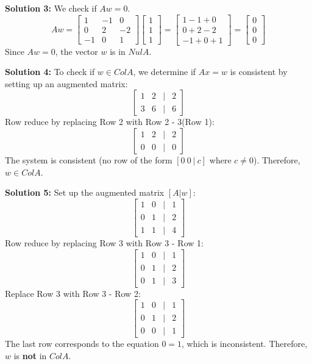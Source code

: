 \documentclass[11pt]{article}
\begin{document}
\vspace{0.3cm}
\textbf{Solution 3:} We check if $Aw = 0$.
$$ Aw = \begin{bmatrix} 1 & -1 & 0 \\ 0 & 2 & -2 \\ -1 & 0 & 1 \end{bmatrix} \begin{bmatrix} 1 \\ 1 \\ 1 \end{bmatrix} = \begin{bmatrix} 1 - 1 + 0 \\ 0 + 2 - 2 \\ -1 + 0 + 1 \end{bmatrix} = \begin{bmatrix} 0 \\ 0 \\ 0 \end{bmatrix} $$
Since $Aw = 0$, the vector $w$ is in $Nul A$.

\vspace{0.3cm}
\textbf{Solution 4:} To check if $w \in Col A$, we determine if $Ax = w$ is consistent by setting up an augmented matrix:
$$ \begin{bmatrix} 1 & 2 & | & 2 \\ 3 & 6 & | & 6 \end{bmatrix} $$
Row reduce by replacing Row 2 with Row 2 - 3(Row 1):
$$ \begin{bmatrix} 1 & 2 & | & 2 \\ 0 & 0 & | & 0 \end{bmatrix} $$
The system is consistent (no row of the form $[0 \ 0 \ | \ c]$ where $c \neq 0$). Therefore, $w \in Col A$.

\vspace{0.3cm}
\textbf{Solution 5:} Set up the augmented matrix $[A | w]$:
$$ \begin{bmatrix} 1 & 0 & | & 1 \\ 0 & 1 & | & 2 \\ 1 & 1 & | & 4 \end{bmatrix} $$
Row reduce by replacing Row 3 with Row 3 - Row 1:
$$ \begin{bmatrix} 1 & 0 & | & 1 \\ 0 & 1 & | & 2 \\ 0 & 1 & | & 3 \end{bmatrix} $$
Replace Row 3 with Row 3 - Row 2:
$$ \begin{bmatrix} 1 & 0 & | & 1 \\ 0 & 1 & | & 2 \\ 0 & 0 & | & 1 \end{bmatrix} $$
The last row corresponds to the equation $0 = 1$, which is inconsistent. Therefore, $w$ is \textbf{not} in $Col A$.
\end{document}
